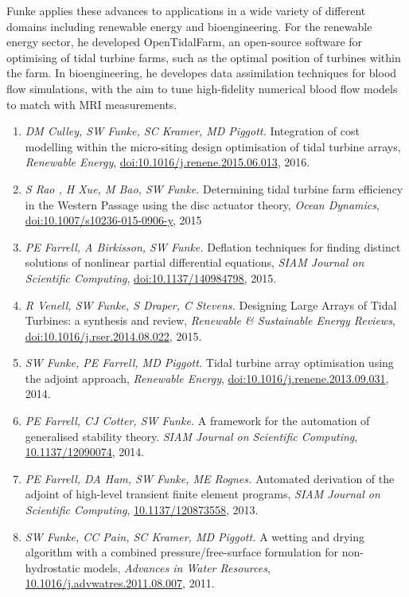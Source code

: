 \documentclass[11pt]{article}
\begin{document}
Funke applies these advances to applications in a wide variety of different
domains including renewable energy and bioengineering. For the renewable energy
sector, he developed OpenTidalFarm, an open-source software for optimising of
tidal turbine farms, such as the optimal position of turbines within the farm.
In bioengineering, he developes data assimilation techniques for blood flow
simulations, with the aim to tune high-fidelity numerical blood flow models to
match with MRI measurements.

\newpage
{}
\begin{enumerate}
    \item \textit{DM Culley, SW Funke, SC Kramer, MD Piggott.} Integration of cost modelling within the micro-siting design optimisation of tidal turbine arrays, \textit{Renewable Energy}, \href{https://doi.org/10.1016/j.renene.2015.06.013}{doi:10.1016/j.renene.2015.06.013}, 2016.
    \item \textit{S Rao , H Xue, M Bao, SW Funke.} Determining tidal turbine farm efficiency in the Western Passage using the disc actuator theory, \textit{Ocean Dynamics}, \href{https://doi.org/10.1007/s10236-015-0906-y}{doi:10.1007/s10236-015-0906-y}, 2015
\item \textit{PE Farrell, A Birkisson, SW Funke.} Deflation techniques for finding distinct solutions of nonlinear partial differential equations, \textit{SIAM Journal on Scientific Computing}, \href{https://doi.org/10.1137/140984798}{doi:10.1137/140984798}, 2015.
\item \textit{R Venell, SW Funke, S Draper, C Stevens.} Designing Large Arrays of Tidal Turbines: a synthesis and review, \textit{Renewable \& Sustainable Energy Reviews}, \href{https://doi.org/10.1016/j.rser.2014.08.022}{doi:10.1016/j.rser.2014.08.022}, 2015.
\item \textit{SW Funke, PE Farrell, MD Piggott.} Tidal turbine array optimisation using the adjoint approach, \textit{Renewable Energy}, \href{https://doi.org/10.1016/j.renene.2013.09.031}{doi:10.1016/j.renene.2013.09.031}, 2014.
\item \textit{PE Farrell, CJ Cotter, SW Funke.} A framework for the automation of generalised stability theory. \textit{SIAM Journal on     Scientific Computing}, \href{https://doi.org/10.1016/10.1137/12090074}{10.1137/12090074}, 2014.
\item \textit{PE Farrell, DA Ham, SW Funke, ME Rognes.} Automated derivation of the adjoint of high-level transient finite element programs, \textit{SIAM Journal on Scientific Computing}, \href{https://doi.org/10.1016/10.1137/120873558}{10.1137/120873558}, 2013.
\item \textit{SW Funke, CC Pain, SC Kramer, MD Piggott.} A wetting and drying algorithm with a combined pressure/free-surface formulation for non-hydrostatic models, \textit{Advances in Water Resources}, \href{https://doi.org/10.1016/j.advwatres.2011.08.007}{10.1016/j.advwatres.2011.08.007}, 2011.
\end{enumerate}
\end{document}
